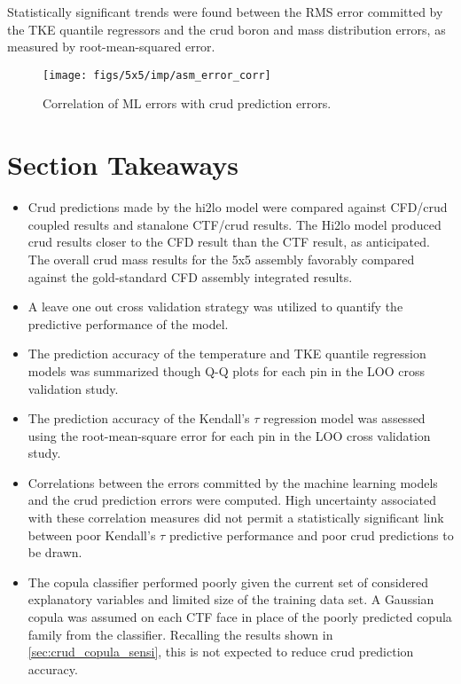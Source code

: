 Statistically significant trends were found between the RMS error committed by the TKE quantile regressors and the crud boron and mass distribution errors, as measured by root-mean-squared error.

\begin{figure}[H]
    \centering
    \texttt{[image: figs/5x5/imp/asm\_error\_corr]}
    \caption{Correlation of ML errors with crud prediction errors.}
    \label{fig:asmerrorcorr}
\end{figure}

\section{Section Takeaways}


\begin{itemize}
    \item Crud predictions made by the hi2lo model were compared against CFD/crud coupled results and stanalone CTF/crud results.  The Hi2lo model produced crud results closer to the CFD result than the CTF result, as anticipated.  The overall crud mass results for the 5x5 assembly favorably compared against the gold-standard CFD assembly integrated results.
    \item A leave one out cross validation strategy was utilized to quantify the predictive performance of the model.
    \item The prediction accuracy of the temperature and TKE quantile regression models was summarized though Q-Q plots for each pin in the LOO cross validation study.
    \item The prediction accuracy of the Kendall's $\tau$ regression model was assessed using the root-mean-square error for each pin in the LOO cross validation study.  \item Correlations between the errors committed by the machine learning models and the crud prediction errors were computed.  High uncertainty associated with these correlation measures did not permit a statistically significant link between poor Kendall's $\tau$ predictive performance and poor crud predictions to be drawn.
        \item The copula classifier performed poorly given the current set of considered explanatory variables and limited size of the training data set.  A Gaussian copula was assumed on each CTF face in place of the poorly predicted copula family from the classifier.  Recalling the results shown in \ref{sec:crud_copula_sensi}, this is not expected to reduce crud prediction accuracy.
\end{itemize}
